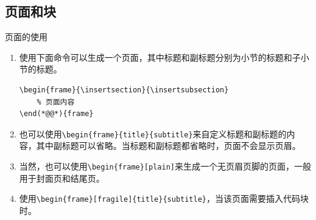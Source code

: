 \documentclass[8pt]{ctexbeamer}
\begin{document}
\subsection{页面和块}
\begin{frame}[fragile]{\insertsection}{\insertsubsection}
    \begin{block}{页面的使用}
        \begin{enumerate}
            \item 使用下面命令可以生成一个页面，其中标题和副标题分别为小节的标题和子小节的标题。
            \begin{lstlisting}[style=latex]
\begin{frame}{\insertsection}{\insertsubsection}
    % 页面内容
\end(*@@*){frame}
            \end{lstlisting}
            \item 也可以使用\lstinline|\begin{frame}{title}{subtitle}|来自定义标题和副标题的内容，其中副标题可以省略。当标题和副标题都省略时，页面不会显示页眉。
            \item 当然，也可以使用\lstinline|\begin{frame}[plain]|来生成一个无页眉页脚的页面，一般用于封面页和结尾页。
            \item 使用\lstinline|\begin{frame}[fragile]{title}{subtitle}|，当该页面需要插入代码块时。
        \end{enumerate}
    \end{block}
\end{frame}
\end{document}
